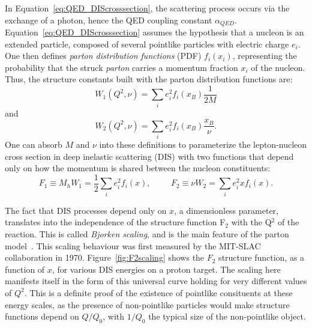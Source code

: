 In Equation~\ref{eq:QED_DIScrosssection}, the scattering process occurs
via the exchange of a photon, hence the QED coupling constant
$\alpha_{QED}$. Equation~\ref{eq:QED_DIScrosssection} assumes the hypothesis that a nucleon is an extended particle,
composed of several pointlike particles with electric charge $e_i$. One then defines \emph{parton
distribution functions} (PDF) $f_i(x_i)$, representing the probability
that the struck
\textit{parton} carries a momentum fraction $x_i$ of the
nucleon. Thus, the structure constants built with the
parton distribution functions are: 
\begin{equation}
W_1(Q^2,\nu)=\displaystyle\sum_{i}e^{2}_{i}f_{i}(x_{B})\frac{1}{2M}
\end{equation}
and
\begin{equation}
W_2(Q^2,\nu)=\displaystyle\sum_{i}e^{2}_{i}f_{i}(x_{B})\frac{x_{B}}{\nu}.
\end{equation}
One can absorb $M$ and $\nu$ into these definitions to parameterize the lepton-nucleon cross section in deep inelastic scattering (DIS) with two functions that depend only on how the momentum is shared between the nucleon constituents:
\begin{equation}
F_1\equiv M_{h} W_1
=\frac{1}{2}\displaystyle\sum_{i}e^{2}_{i}f_{i}(x), \hspace{1cm}
F_2\equiv \nu W_2 =\displaystyle\sum_{i}e^{2}_{i}xf_{i}(x).
\end{equation}

The fact that DIS processes depend only on $x$, a dimensionless
parameter, translates into the independence of the structure function
F$_2$ with the Q$^{2}$ of the reaction. This is called \textit{Bjorken
  scaling}, and is the main feature of the parton
model~\cite{webber3}. This scaling behaviour was first measured by the
MIT-SLAC collaboration in 1970. Figure~\ref{fig:F2scaling} shows the
$F_{2}$ structure function, as a function of $x$, for various 
DIS energies on a proton target. The scaling here manifests itself in
the form of this universal curve holding for very different values of
$Q^{2}$. This is a definite proof of the existence of pointlike
consituents at these energy scales, as the presence of non-pointlike
particles would make structure functions depend on  $Q/Q_{0}$, with
$1/Q_{0}$ the typical size of the non-pointlike object.

